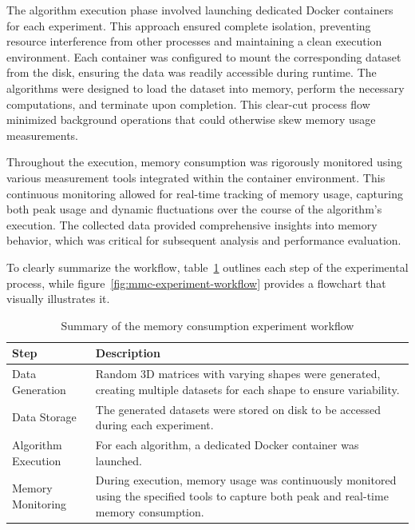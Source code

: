 The algorithm execution phase involved launching dedicated Docker containers for each experiment.
This approach ensured complete isolation, preventing resource interference from other processes and maintaining a clean execution environment.
Each container was configured to mount the corresponding dataset from the disk, ensuring the data was readily accessible during runtime.
The algorithms were designed to load the dataset into memory, perform the necessary computations, and terminate upon completion.
This clear-cut process flow minimized background operations that could otherwise skew memory usage measurements.

Throughout the execution, memory consumption was rigorously monitored using various measurement tools integrated within the container environment.
This continuous monitoring allowed for real-time tracking of memory usage, capturing both peak usage and dynamic fluctuations over the course of the algorithm's execution.
The collected data provided comprehensive insights into memory behavior, which was critical for subsequent analysis and performance evaluation.

To clearly summarize the workflow, table~\ref{tab:mmc-experimental-workflow} outlines each step of the experimental process, while figure~\ref{fig:mmc-experiment-workflow} provides a flowchart that visually illustrates it.

\begin{table}[h]
    \centering
    \renewcommand{\arraystretch}{1.4}
    \setlength{\tabcolsep}{10pt}
    \begin{tabular}{|>{\raggedright\arraybackslash}p{3.5cm}|>{\raggedright\arraybackslash}p{7cm}|}
        \hline
        \textbf{Step}       & \textbf{Description}                                                                                                                       \\ \hline
        Data Generation     & Random \ac{3D} matrices with varying shapes were generated, creating multiple datasets for each shape to ensure variability.               \\ \hline
        Data Storage        & The generated datasets were stored on disk to be accessed during each experiment.                                                          \\ \hline
        Algorithm Execution & For each algorithm, a dedicated Docker container was launched.                                                                             \\ \hline
        Memory Monitoring   & During execution, memory usage was continuously monitored using the specified tools to capture both peak and real-time memory consumption. \\ \hline
    \end{tabular}
    \caption{Summary of the memory consumption experiment workflow}
    \label{tab:mmc-experimental-workflow}
\end{table}

